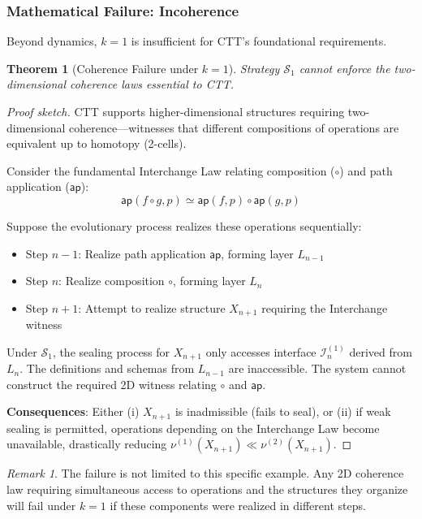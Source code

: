 \documentclass[11pt]{article}
\theoremstyle{definition}
\theoremstyle{plain}
\newtheorem{theorem}{Theorem}
\theoremstyle{remark}
\newtheorem{remark}{Remark}
\begin{document}
\subsubsection{Mathematical Failure: Incoherence}

Beyond dynamics, $k=1$ is insufficient for CTT's foundational requirements.

\begin{theorem}[Coherence Failure under $k=1$]\label{thm:k1-coherence}
Strategy $\mathcal{S}_1$ cannot enforce the two-dimensional coherence laws essential to CTT.
\end{theorem}

\begin{proof}[Proof sketch]
CTT supports higher-dimensional structures requiring two-dimensional coherence—witnesses that different compositions of operations are equivalent up to homotopy (2-cells). 

Consider the fundamental Interchange Law relating composition ($\circ$) and path application ($\mathsf{ap}$):
\[
\mathsf{ap}(f \circ g, p) \simeq \mathsf{ap}(f, p) \circ \mathsf{ap}(g, p)
\]

Suppose the evolutionary process realizes these operations sequentially:
\begin{itemize}
\item Step $n-1$: Realize path application $\mathsf{ap}$, forming layer $L_{n-1}$
\item Step $n$: Realize composition $\circ$, forming layer $L_n$
\item Step $n+1$: Attempt to realize structure $X_{n+1}$ requiring the Interchange witness
\end{itemize}

Under $\mathcal{S}_1$, the sealing process for $X_{n+1}$ only accesses interface $\mathcal{I}_n^{(1)}$ derived from $L_n$. The definitions and schemas from $L_{n-1}$ are inaccessible. The system cannot construct the required 2D witness relating $\circ$ and $\mathsf{ap}$.

\textbf{Consequences}: Either (i) $X_{n+1}$ is inadmissible (fails to seal), or (ii) if weak sealing is permitted, operations depending on the Interchange Law become unavailable, drastically reducing $\nu^{(1)}(X_{n+1}) \ll \nu^{(2)}(X_{n+1})$.
\end{proof}

\begin{remark}
The failure is not limited to this specific example. Any 2D coherence law requiring simultaneous access to operations and the structures they organize will fail under $k=1$ if these components were realized in different steps.
\end{remark}
\end{document}
